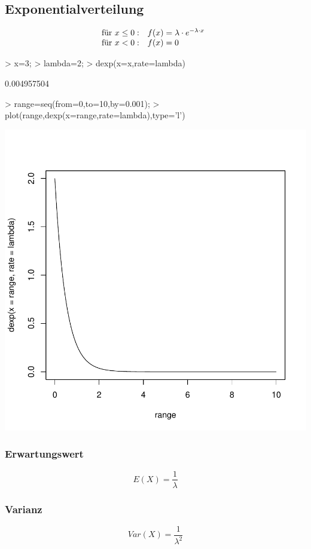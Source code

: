 \subsection{Exponentialverteilung}
\[ \begin{array}{@{}ll}
  \text{für }x \leq 0: & f(x) = \lambda \cdot e^{-\lambda \cdot x} \\
  \text{für }x < 0:    & f(x) = 0
\end{array} \]
\begin{Schunk}
\begin{Sinput}
> x=3;
> lambda=2;
> dexp(x=x,rate=lambda)
\end{Sinput}
\begin{Soutput}
[1] 0.004957504
\end{Soutput}
\begin{Sinput}
> range=seq(from=0,to=10,by=0.001);
> plot(range,dexp(x=range,rate=lambda),type='l')
\end{Sinput}
\end{Schunk}
\includegraphics{definitionen-021}

\subsubsection{Erwartungswert}
\[ E(X) = \frac{1}{\lambda} \]

\subsubsection{Varianz}
\[ Var(X) = \frac{1}{\lambda^2} \]

